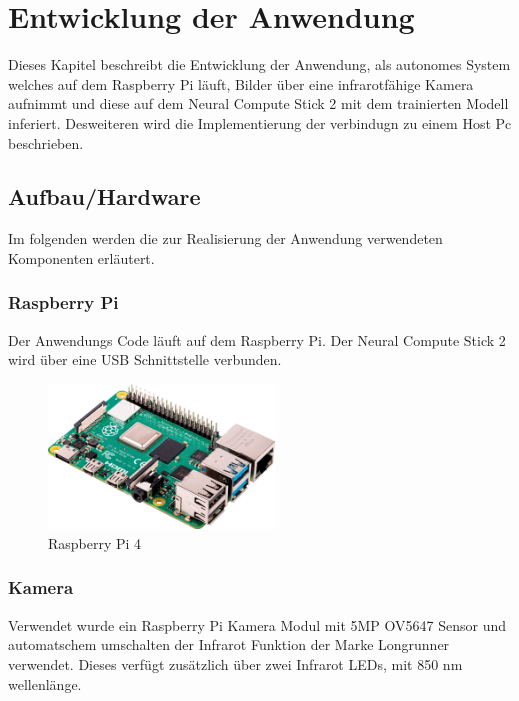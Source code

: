 
\chapter{Entwicklung der Anwendung}\label{kap:application}

Dieses Kapitel beschreibt die Entwicklung der Anwendung, als 
autonomes System welches auf dem Raspberry Pi läuft, 
Bilder über eine infrarotfähige Kamera aufnimmt und diese
auf dem Neural Compute Stick 2 mit dem trainierten Modell 
inferiert.
Desweiteren wird die Implementierung der verbindugn zu einem 
Host Pc beschrieben.


\section{Aufbau/Hardware}\label{sec:aufbau}

Im folgenden werden die zur Realisierung der Anwendung verwendeten 
Komponenten erläutert.

\subsection*{Raspberry Pi}
Der Anwendungs Code läuft auf dem Raspberry Pi. 
Der Neural Compute Stick 2 wird über eine USB Schnittstelle verbunden.


\begin{figure}[H]
    \centering
    \includegraphics[width=6cm]{./Bilder/raspberrypi_4.png}
    \caption{Raspberry Pi 4}
    \label{img:raspberrypi}
\end{figure}



\subsection*{Kamera}
Verwendet wurde ein Raspberry Pi Kamera Modul mit 5MP OV5647 Sensor 
und automatschem umschalten der Infrarot Funktion der Marke 
Longrunner verwendet.
Dieses verfügt zusätzlich über zwei Infrarot LEDs, mit 850 nm wellenlänge.

